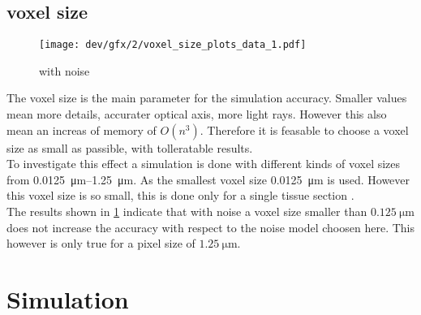\subsection{voxel size \texorpdfstring{\voxels{}}{}}
% 
% 
% 
\begin{figure}[!tp]%
\centering
\texttt{[image: dev/gfx/2/voxel\_size\_plots\_data\_1.pdf]}
\caption[voxel size model with noise]{with noise \dummy{}}
\label{fig:voxelsizeNoise}
\end{figure}
% 
The voxel size \voxelsize{} is the main parameter for the simulation accuracy.
Smaller values mean more details, accurater optical axis, more light rays.
However this also mean an increas of memory of $O(n^3)$.
Therefore it is feasable to choose a voxel size as small as passible, with tolleratable results.
\\
% 
To investigate this effect a simulation is done with different kinds of voxel sizes from \SIrange{0.0125}{1.25}{\micro\meter}.
As  the smallest voxel size \SI{0.0125}{\micro\meter} is used. 
However this voxel size is so small, this is done only for a single tissue section .
\\
%
The results shown in \cref{fig:voxelsizeNoise} indicate that with noise a voxel size smaller than $\SI{0.125}{\micro\meter}$ does not increase the accuracy with respect to the noise model choosen here.
This however is only true for a pixel size of $\SI{1.25}{\micro\meter}$.
% 
% 
% 
\newpage
% 
\section{Simulation}
% 
% 
% 
